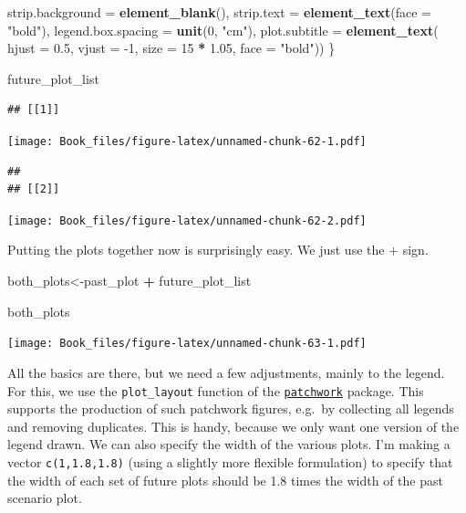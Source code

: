 \documentclass[
]{book}
\newenvironment{Shaded}{\begin{snugshade}}{\end{snugshade}}
\newcommand{\DataTypeTok}[1]{\textcolor[rgb]{0.13,0.29,0.53}{#1}}
\newcommand{\DecValTok}[1]{\textcolor[rgb]{0.00,0.00,0.81}{#1}}
\newcommand{\FloatTok}[1]{\textcolor[rgb]{0.00,0.00,0.81}{#1}}
\newcommand{\KeywordTok}[1]{\textcolor[rgb]{0.13,0.29,0.53}{\textbf{#1}}}
\newcommand{\NormalTok}[1]{#1}
\newcommand{\OperatorTok}[1]{\textcolor[rgb]{0.81,0.36,0.00}{\textbf{#1}}}
\newcommand{\StringTok}[1]{\textcolor[rgb]{0.31,0.60,0.02}{#1}}
\begin{document}
\begin{Shaded}
\begin{Highlighting}[]
          \DataTypeTok{strip.background =} \KeywordTok{element_blank}\NormalTok{(),}
          \DataTypeTok{strip.text =} \KeywordTok{element_text}\NormalTok{(}\DataTypeTok{face =} \StringTok{"bold"}\NormalTok{),}
          \DataTypeTok{legend.box.spacing =} \KeywordTok{unit}\NormalTok{(}\DecValTok{0}\NormalTok{, }\StringTok{"cm"}\NormalTok{),}
          \DataTypeTok{plot.subtitle =} \KeywordTok{element_text}\NormalTok{(}
            \DataTypeTok{hjust =} \FloatTok{0.5}\NormalTok{,}
            \DataTypeTok{vjust =} \DecValTok{-1}\NormalTok{,}
            \DataTypeTok{size =} \DecValTok{15} \OperatorTok{*}\StringTok{ }\FloatTok{1.05}\NormalTok{,}
            \DataTypeTok{face =} \StringTok{"bold"}\NormalTok{)) }
\NormalTok{\}}

\NormalTok{future_plot_list}
\end{Highlighting}
\end{Shaded}

\begin{verbatim}
## [[1]]
\end{verbatim}

\texttt{[image: Book\_files/figure-latex/unnamed-chunk-62-1.pdf]}

\begin{verbatim}
## 
## [[2]]
\end{verbatim}

\texttt{[image: Book\_files/figure-latex/unnamed-chunk-62-2.pdf]}

Putting the plots together now is surprisingly easy. We just use the + sign.

\begin{Shaded}
\begin{Highlighting}[]
\NormalTok{both_plots<-past_plot }\OperatorTok{+}\StringTok{ }\NormalTok{future_plot_list}

\NormalTok{both_plots}
\end{Highlighting}
\end{Shaded}

\texttt{[image: Book\_files/figure-latex/unnamed-chunk-63-1.pdf]}

All the basics are there, but we need a few adjustments, mainly to the legend. For this, we use the \texttt{plot\_layout} function of the \href{https://cran.r-project.org/web/packages/patchwork/patchwork.pdf}{\texttt{patchwork}} package. This supports the production of such patchwork figures, e.g.~by collecting all legends and removing duplicates. This is handy, because we only want one version of the legend drawn. We can also specify the width of the various plots. I'm making a vector \texttt{c(1,1.8,1.8)} (using a slightly more flexible formulation) to specify that the width of each set of future plots should be 1.8 times the width of the past scenario plot.
\end{document}
